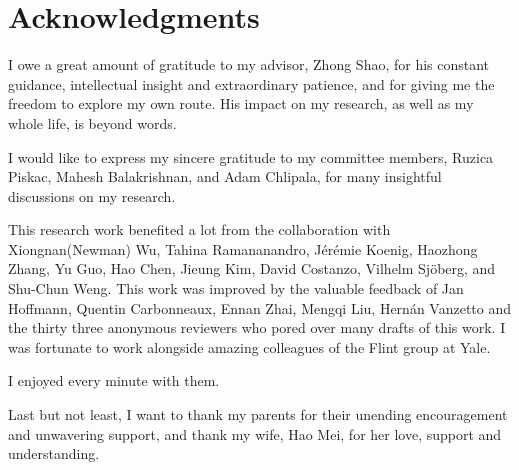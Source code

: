 

\chapter*{Acknowledgments}
\thispagestyle{empty}

I owe a great amount of gratitude to my advisor, Zhong Shao, for
his constant guidance, intellectual insight and extraordinary patience,
and for giving me the freedom to explore my own route.
His impact on my research, as well as my whole life, is beyond words.

I would like to express my sincere gratitude to my committee members,
Ruzica Piskac, Mahesh Balakrishnan, and Adam Chlipala, for many insightful
discussions on my research.

This research work benefited a lot from 
the collaboration with Xiongnan(Newman) Wu,
Tahina Ramananandro,
J\'{e}r\'{e}mie Koenig,
Haozhong Zhang,
Yu Guo,
Hao Chen,
Jieung Kim,
David Costanzo,
Vilhelm Sj\"{o}berg,
and Shu-Chun Weng.
This work was improved by the valuable feedback of 
Jan Hoffmann,
Quentin Carbonneaux,
Ennan Zhai, Mengqi Liu,
Hern\'{a}n Vanzetto
and the thirty three anonymous reviewers who pored over many drafts
of this work.
I was fortunate to work alongside 
amazing colleagues of the Flint group at Yale. 
I enjoyed every minute with them.

Last but not least, I want to thank my parents 
for their unending encouragement and unwavering support, 
and thank my wife, Hao Mei,
for her love, support and understanding.

\clearpage
